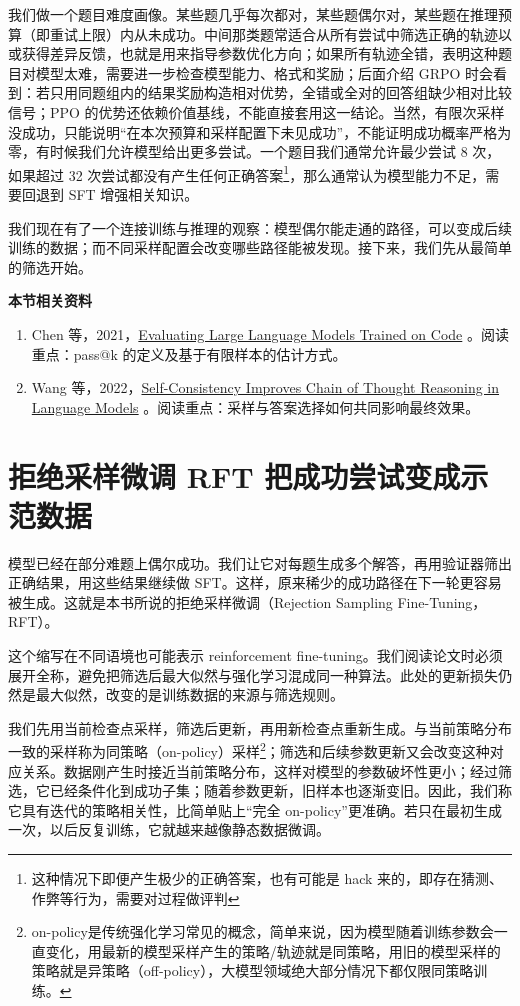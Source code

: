 我们做一个题目难度画像。某些题几乎每次都对，某些题偶尔对，某些题在推理预算（即重试上限）内从未成功。中间那类题常适合从所有尝试中筛选正确的轨迹以或获得差异反馈，也就是用来指导参数优化方向；如果所有轨迹全错，表明这种题目对模型太难，需要进一步检查模型能力、格式和奖励；后面介绍 GRPO 时会看到：若只用同题组内的结果奖励构造相对优势，全错或全对的回答组缺少相对比较信号；PPO 的优势还依赖价值基线，不能直接套用这一结论。当然，有限次采样没成功，只能说明``在本次预算和采样配置下未见成功''，不能证明成功概率严格为零，有时候我们允许模型给出更多尝试。一个题目我们通常允许最少尝试 8 次，如果超过 32 次尝试都没有产生任何正确答案\footnote{这种情况下即便产生极少的正确答案，也有可能是 hack 来的，即存在猜测、作弊等行为，需要对过程做评判}，那么通常认为模型能力不足，需要回退到 SFT 增强相关知识。

我们现在有了一个连接训练与推理的观察：模型偶尔能走通的路径，可以变成后续训练的数据；而不同采样配置会改变哪些路径能被发现。接下来，我们先从最简单的筛选开始。

\textbf{本节相关资料}
\begin{enumerate}
    \item Chen 等，2021，\href{https://arxiv.org/abs/2107.03374}{Evaluating Large Language Models Trained on Code} 。阅读重点：pass@k 的定义及基于有限样本的估计方式。
    \item Wang 等，2022，\href{https://arxiv.org/abs/2203.11171}{Self-Consistency Improves Chain of Thought Reasoning in Language Models} 。阅读重点：采样与答案选择如何共同影响最终效果。
\end{enumerate}

\section{拒绝采样微调 RFT 把成功尝试变成示范数据}\label{拒绝采样微调 RFT 把成功尝试变成示范数据}

模型已经在部分难题上偶尔成功。我们让它对每题生成多个解答，再用验证器筛出正确结果，用这些结果继续做 SFT。这样，原来稀少的成功路径在下一轮更容易被生成。这就是本书所说的拒绝采样微调（Rejection Sampling Fine-Tuning，RFT）。

这个缩写在不同语境也可能表示 reinforcement fine-tuning。我们阅读论文时必须展开全称，避免把筛选后最大似然与强化学习混成同一种算法。此处的更新损失仍然是最大似然，改变的是训练数据的来源与筛选规则。

我们先用当前检查点采样，筛选后更新，再用新检查点重新生成。与当前策略分布一致的采样称为同策略（on-policy）采样\footnote{on-policy是传统强化学习常见的概念，简单来说，因为模型随着训练参数会一直变化，用最新的模型采样产生的策略/轨迹就是同策略，用旧的模型采样的策略就是异策略（off-policy），大模型领域绝大部分情况下都仅限同策略训练。}；筛选和后续参数更新又会改变这种对应关系。数据刚产生时接近当前策略分布，这样对模型的参数破坏性更小；经过筛选，它已经条件化到成功子集；随着参数更新，旧样本也逐渐变旧。因此，我们称它具有迭代的策略相关性，比简单贴上``完全 on-policy''更准确。若只在最初生成一次，以后反复训练，它就越来越像静态数据微调。

